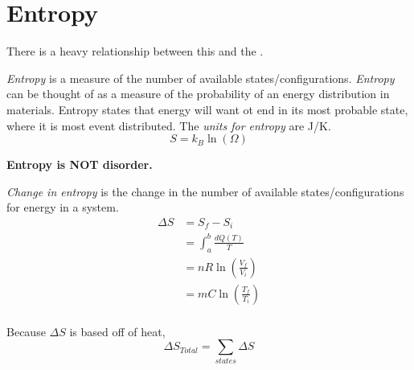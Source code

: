 \section{Entropy}\label{sec:Entropy}
There is a heavy relationship between this and the .
\begin{definition}[Entropy]\label{def:Entropy}
  \emph{Entropy} is a measure of the number of available states/configurations.
  \emph{Entropy} can be thought of as a measure of the probability of an energy distribution in materials.
  Entropy states that energy will want ot end in its most probable state, where it is most event distributed.
  The \emph{units for entropy} are \si{\joule / \kelvin}.
  \begin{equation}\label{eq:Entropy}
    S = k_{B} \ln \left( \Omega \right)
  \end{equation}
  \begin{note}
    \textbf{Entropy is NOT disorder.}
  \end{note}
\end{definition}
\begin{definition}\label{def:Change in Entropy}
  \emph{Change in entropy} is the change in the number of available states/configurations for energy in a system.
  \begin{equation}\label{eq:Change in Entropy}
    \begin{aligned}
      \Delta S &= S_{f} - S_{i} \\
      &= \int_{a}^{b} \frac{dQ \left( T \right)}{T} \\
      &= nR \ln \left( \frac{V_{f}}{V_{i}} \right) \\
      &= mC \ln \left( \frac{T_{f}}{T_{i}} \right) \\
    \end{aligned}
  \end{equation}
  \begin{note}
    Because $\Delta S$ is based off of heat,
    \begin{equation}
      \Delta S_{Total} = \sum_{states} \Delta S
    \end{equation}
  \end{note}
\end{definition}

